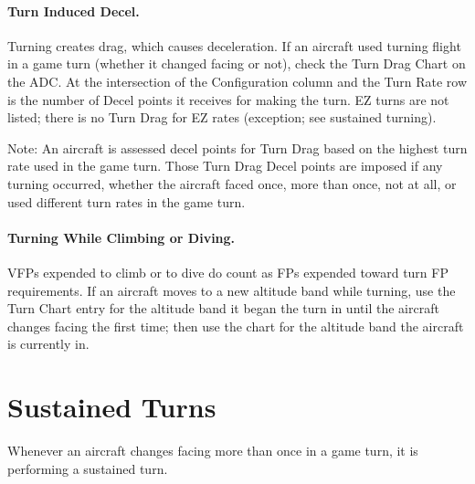 \paragraph{Turn Induced Decel.} Turning creates drag, which causes deceleration. If an aircraft used turning flight in a game turn (whether it changed facing or not), check the Turn Drag Chart on the ADC. At the intersection of the Configuration column and the Turn Rate row is the number of Decel points it receives for making the turn. EZ turns are not listed; there is no Turn Drag for EZ rates (exception; see sustained turning). 

Note: An aircraft is assessed decel points for Turn Drag based on the highest turn rate used in the game turn. Those Turn Drag Decel points are imposed if any turning occurred, whether the aircraft faced once, more than once, not at all, or used different turn rates in the game turn.



\paragraph{Turning While Climbing or Diving.} VFPs expended to climb or to dive do count as FPs expended toward turn FP requirements. If an aircraft moves to a new altitude band while turning, use the Turn Chart entry for the altitude band it began the turn in until the aircraft changes facing the first time; then use the chart for the altitude band the aircraft is currently in.

\advancedrules

\section{Sustained Turns}
\label{rule:sustained-turning}

Whenever an aircraft changes facing more than once in a game turn, it is performing a sustained turn.



